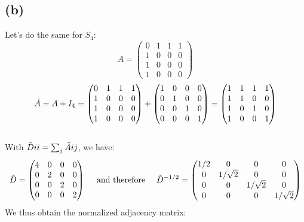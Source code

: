 \documentclass[a4paper]{article}
\begin{document}
\subsection*{(b)}
Let's do the same for $S_4$:
\[
A = \begin{pmatrix}
0 & 1 & 1 & 1 \\
1 & 0 & 0 & 0 \\
1 & 0 & 0 & 0 \\
1 & 0 & 0 & 0
\end{pmatrix}
\]
\[
\Tilde{A} = A + I_4= \begin{pmatrix}
0 & 1 & 1 & 1 \\
1 & 0 & 0 & 0 \\
1 & 0 & 0 & 0 \\
1 & 0 & 0 & 0
\end{pmatrix} + \begin{pmatrix}
1 & 0 & 0 & 0 \\
0 & 1 & 0 & 0 \\
0 & 0 & 1 & 0 \\
0 & 0 & 0 & 1
\end{pmatrix} = \begin{pmatrix}
1 & 1 & 1 & 1 \\
1 & 1 & 0 & 0 \\
1 & 0 & 1 & 0 \\
1 & 0 & 0 & 1
\end{pmatrix}
\]
\\
With $\Tilde{D}{ii} = \sum_j \Tilde{A}{ij}$, we have:
\[
\Tilde{D} = \begin{pmatrix}
4 & 0 & 0 & 0 \\
0 & 2 & 0 & 0 \\
0 & 0 & 2 & 0 \\
0 & 0 & 0 & 2
\end{pmatrix}\ \ \ \text{  and therefore }\ \ \ \Tilde{D}^{-1/2} = \begin{pmatrix}
1/2 & 0 & 0 & 0 \\
0 & 1/\sqrt{2} & 0 & 0 \\
0 & 0 & 1/\sqrt{2} & 0 \\
0 & 0 & 0 & 1/\sqrt{2}
\end{pmatrix}
\]
We thus obtain the normalized adjacency matrix:
\end{document}
